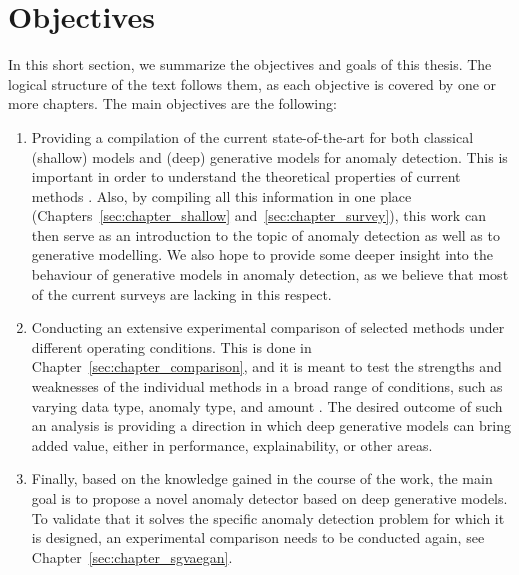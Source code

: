\section{Objectives}
In this short section, we summarize the objectives and goals of this thesis. The logical structure of the text follows them, as each objective is covered by one or more chapters. The main objectives are the following:

\begin{enumerate}
    \item Providing a compilation of the current state-of-the-art for both classical (shallow) models and (deep) generative models for anomaly detection. This is important in order to understand the theoretical properties of current methods . Also, by compiling all this information in one place (Chapters~\ref{sec:chapter_shallow} and~\ref{sec:chapter_survey}), this work can then serve as an introduction to the topic of anomaly detection as well as to generative modelling. We also hope  to provide some deeper insight into the behaviour of generative models in anomaly detection, as we believe that most of the current surveys are lacking in this respect.
    \item Conducting an extensive experimental comparison of selected methods under different operating conditions. This is done in Chapter~\ref{sec:chapter_comparison}, and it is meant to test the strengths and weaknesses of the individual methods in a broad range of conditions, such as varying data type, anomaly type, and amount . The desired outcome of such an analysis is providing a direction in which deep generative models can bring added value, either in performance, explainability, or other areas. 
    \item Finally, based on the knowledge gained in the course of the work, the main goal is to propose a novel anomaly detector based on deep generative models. To validate that it solves the specific anomaly detection problem for which it is designed, an experimental comparison needs to be conducted again, see Chapter~\ref{sec:chapter_sgvaegan}.
\end{enumerate}
